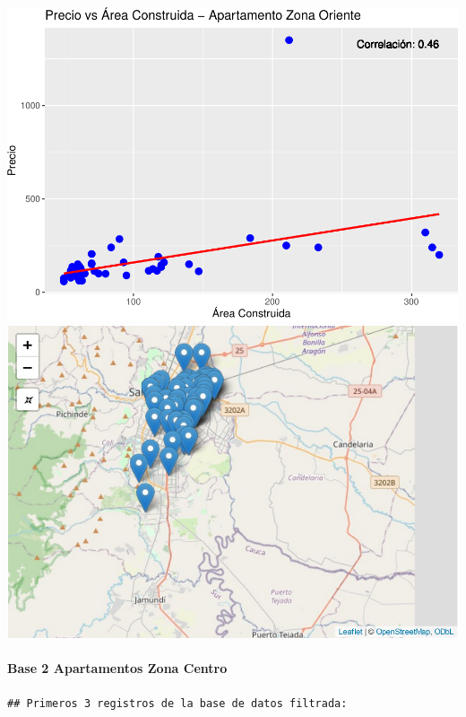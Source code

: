 \documentclass[
]{article}
\begin{document}
\includegraphics{A2_U2_InformeEjecutivo_files/figure-latex/unnamed-chunk-27-1.pdf}
\includegraphics{A2_U2_InformeEjecutivo_files/figure-latex/unnamed-chunk-27-2.pdf}

\paragraph{\texorpdfstring{\textbf{Base 2 Apartamentos Zona
Centro}}{Base 2 Apartamentos Zona Centro}}\label{base-2-apartamentos-zona-centro}

\begin{verbatim}
## Primeros 3 registros de la base de datos filtrada:
\end{verbatim}
\end{document}

